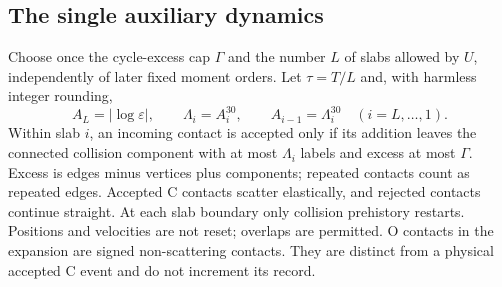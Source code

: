 \documentclass[11pt,letterpaper]{article}
\numberwithin{equation}{section}
\theoremstyle{definition}\newtheorem{assumption}[theorem]{Assumption}
\theoremstyle{remark}\newtheorem{remark}[theorem]{Remark}
\newcommand{\eps}{\varepsilon}\newcommand{\dd}{\,\mathrm d}
\begin{document}
\subsection{The single auxiliary dynamics}
Choose once the cycle-excess cap $\Gamma$ and the number $L$ of slabs allowed by $U$, independently of later fixed moment orders. Let $\tau=T/L$ and, with harmless integer rounding,
\begin{equation}\label{eq:caps}
 A_L=|\log\eps|,\qquad \Lambda_i=A_i^{30},\qquad
 A_{i-1}=\Lambda_i^{30}\quad (i=L,\ldots,1).
\end{equation}
Within slab $i$, an incoming contact is accepted only if its addition leaves the connected collision component with at most $\Lambda_i$ labels and excess at most $\Gamma$. Excess is edges minus vertices plus components; repeated contacts count as repeated edges. Accepted C contacts scatter elastically, and rejected contacts continue straight. At each slab boundary only collision prehistory restarts. Positions and velocities are not reset; overlaps are permitted. O contacts in the expansion are signed non-scattering contacts. They are distinct from a physical accepted C event and do not increment its record.
\end{document}
